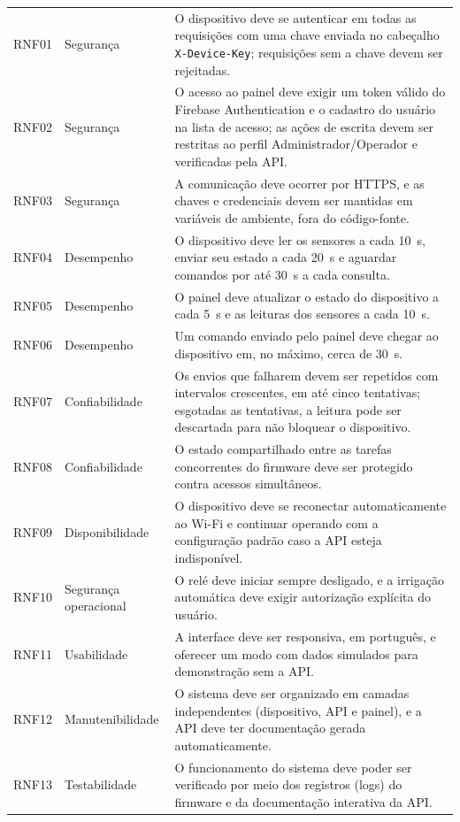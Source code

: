 {\begin{longtable}{>{\raggedright\arraybackslash}p{1.3cm}
                  >{\raggedright\arraybackslash}p{3.0cm}
                  >{\raggedright\arraybackslash}p{10.2cm}}
  \endfoot
  \hline
  \endlastfoot
  RNF01 & Segurança & O dispositivo deve se autenticar em todas as requisições com uma chave enviada no cabeçalho \texttt{X-Device-Key}; requisições sem a chave devem ser rejeitadas. \\
  RNF02 & Segurança & O acesso ao painel deve exigir um token válido do Firebase Authentication e o cadastro do usuário na lista de acesso; as ações de escrita devem ser restritas ao perfil Administrador/Operador e verificadas pela API. \\
  RNF03 & Segurança & A comunicação deve ocorrer por HTTPS, e as chaves e credenciais devem ser mantidas em variáveis de ambiente, fora do código-fonte. \\
  RNF04 & Desempenho & O dispositivo deve ler os sensores a cada 10~s, enviar seu estado a cada 20~s e aguardar comandos por até 30~s a cada consulta. \\
  RNF05 & Desempenho & O painel deve atualizar o estado do dispositivo a cada 5~s e as leituras dos sensores a cada 10~s. \\
  RNF06 & Desempenho & Um comando enviado pelo painel deve chegar ao dispositivo em, no máximo, cerca de 30~s. \\
  RNF07 & Confiabilidade & Os envios que falharem devem ser repetidos com intervalos crescentes, em até cinco tentativas; esgotadas as tentativas, a leitura pode ser descartada para não bloquear o dispositivo. \\
  RNF08 & Confiabilidade & O estado compartilhado entre as tarefas concorrentes do firmware deve ser protegido contra acessos simultâneos. \\
  RNF09 & Disponibilidade & O dispositivo deve se reconectar automaticamente ao Wi-Fi e continuar operando com a configuração padrão caso a API esteja indisponível. \\
  RNF10 & Segurança operacional & O relé deve iniciar sempre desligado, e a irrigação automática deve exigir autorização explícita do usuário. \\
  RNF11 & Usabilidade & A interface deve ser responsiva, em português, e oferecer um modo com dados simulados para demonstração sem a API. \\
  RNF12 & Manutenibilidade & O sistema deve ser organizado em camadas independentes (dispositivo, API e painel), e a API deve ter documentação gerada automaticamente. \\
  RNF13 & Testabilidade & O funcionamento do sistema deve poder ser verificado por meio dos registros (logs) do firmware e da documentação interativa da API. \\

\end{longtable}}
